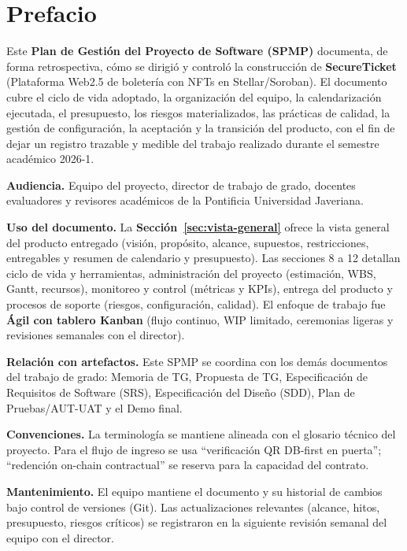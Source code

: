 \documentclass[12pt,oneside]{report}
\newcommand{\projectname}{SecureTicket}
\newcommand{\projectsubtitle}{Plataforma Web2.5 de boletería con NFTs en Stellar/Soroban}
\begin{document}
  \section*{Prefacio}
  Este \textbf{Plan de Gestión del Proyecto de Software (SPMP)} documenta, de forma retrospectiva, cómo se dirigió y controló la construcción de \textbf{\projectname} (\projectsubtitle). El documento cubre el ciclo de vida adoptado, la organización del equipo, la calendarización ejecutada, el presupuesto, los riesgos materializados, las prácticas de calidad, la gestión de configuración, la aceptación y la transición del producto, con el fin de dejar un registro trazable y medible del trabajo realizado durante el semestre académico 2026-1.

  \textbf{Audiencia.} Equipo del proyecto, director de trabajo de grado, docentes evaluadores y revisores académicos de la Pontificia Universidad Javeriana.

  \textbf{Uso del documento.} La \textbf{Sección~\ref{sec:vista-general}} ofrece la vista general del producto entregado (visión, propósito, alcance, supuestos, restricciones, entregables y resumen de calendario y presupuesto). Las secciones 8 a 12 detallan ciclo de vida y herramientas, administración del proyecto (estimación, WBS, Gantt, recursos), monitoreo y control (métricas y KPIs), entrega del producto y procesos de soporte (riesgos, configuración, calidad). El enfoque de trabajo fue \textbf{Ágil con tablero Kanban} (flujo continuo, WIP limitado, ceremonias ligeras y revisiones semanales con el director).

  \textbf{Relación con artefactos.} Este SPMP se coordina con los demás documentos del trabajo de grado: Memoria de TG, Propuesta de TG, Especificación de Requisitos de Software (SRS), Especificación del Diseño (SDD), Plan de Pruebas/AUT-UAT y el Demo final.

  \textbf{Convenciones.} La terminología se mantiene alineada con el glosario técnico del proyecto. Para el flujo de ingreso se usa ``verificación QR DB-first en puerta''; ``redención on-chain contractual'' se reserva para la capacidad del contrato.

  \textbf{Mantenimiento.} El equipo mantiene el documento y su historial de cambios bajo control de versiones (Git). Las actualizaciones relevantes (alcance, hitos, presupuesto, riesgos críticos) se registraron en la siguiente revisión semanal del equipo con el director.

  \tableofcontents
  \listoffigures
  \listoftables
  \clearpage
\end{document}
